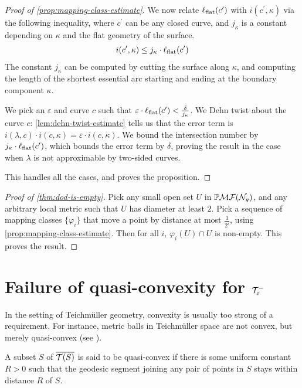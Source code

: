 \documentclass[12pt, reqno]{amsart}
\begin{document}
\begin{proof}[Proof of \autoref{prop:mapping-class-estimate}]
  We now relate $\ell_{\mathrm{flat}}(c^{\prime})$ with $i(c^{\prime}, \kappa)$ via the following inequality, where $c^{\prime}$ can be any closed curve, and $j_{\kappa}$ is a constant depending on $\kappa$ and the flat geometry of the surface.
  \begin{align}
    \label{eq:13}
    i(c^{\prime}, \kappa) \leq j_{\kappa} \cdot \ell_{\mathrm{flat}}(c^{\prime})
  \end{align}
  The constant $j_{\kappa}$ can be computed by cutting the surface along $\kappa$, and computing the length of the shortest essential arc starting and ending at the boundary component $\kappa$.

  We pick an $\varepsilon$ and curve $c$ such that $\varepsilon \cdot \ell_{\mathrm{flat}}(c^{\prime}) < \frac{\delta}{j_{\kappa}}$.
  We Dehn twist about the curve $c$: \autoref{lem:dehn-twist-estimate} tells us that the error term is $i(\lambda, c) \cdot i(c, \kappa) = \varepsilon \cdot i(c, \kappa)$.
  We bound the intersection number by $j_{\kappa} \cdot \ell_{\mathrm{flat}}(c^{\prime})$, which bounds the error term by $\delta$, proving the result in the case when $\lambda$ is not approximable by two-sided curves.

  This handles all the cases, and proves the proposition.
\end{proof}

\begin{proof}[Proof of \autoref{thm:dod-is-empty}]
  Pick any small open set $U$ in $\mathbb{P}\mathcal{MF}(\mathcal{N}_g)$, and any arbitrary local metric such that $U$ has diameter at least $2$.
  Pick a sequence of mapping classes $\{\varphi_i\}$ that move a point by distance at most $\frac{1}{2^i}$, using \autoref{prop:mapping-class-estimate}.
  Then for all $i$, $\varphi_i(U) \cap U$ is non-empty.
  This proves the result.
\end{proof}

\section{Failure of quasi-convexity for $\mathcal{T}_{\varepsilon}^{-}$}
\label{sec:fail-quasi-conv}

In the setting of Teichm\"uller geometry, convexity is usually too strong of a requirement.
For instance, metric balls in Teichm\"uller space are not convex, but merely quasi-convex (see \autocite{lenzhen2011length}).
\begin{definition}
  A subset $S$ of $\overline{\mathcal{T}(S)}$ is said to be quasi-convex if there is some uniform constant $R > 0$ such that the geodesic segment joining any pair of points in $S$ stays within distance $R$ of $S$.
\end{definition}
\end{document}
